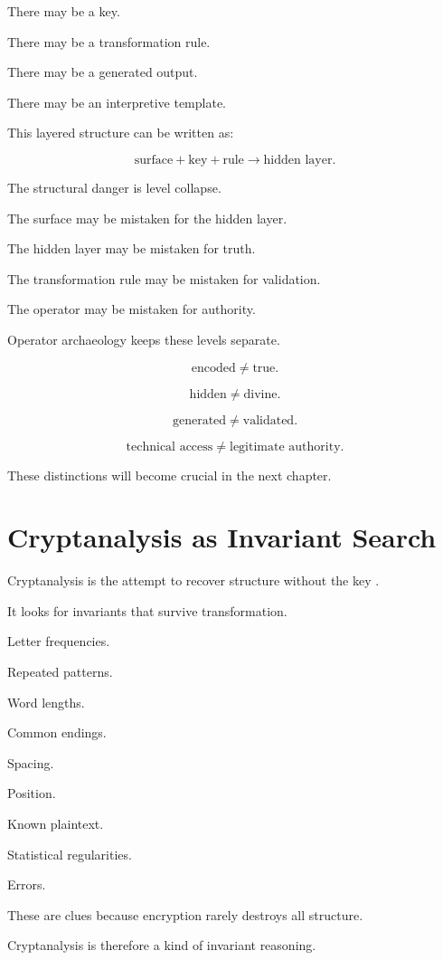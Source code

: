 \documentclass[11pt]{book}
\begin{document}
There may be a key.

There may be a transformation rule.

There may be a generated output.

There may be an interpretive template.

This layered structure can be written as:

\[
\text{surface}
+
\text{key}
+
\text{rule}
\rightarrow
\text{hidden layer}.
\]

The structural danger is level collapse.

The surface may be mistaken for the hidden layer.

The hidden layer may be mistaken for truth.

The transformation rule may be mistaken for validation.

The operator may be mistaken for authority.

Operator archaeology keeps these levels separate.

\[
\text{encoded} \neq \text{true}.
\]

\[
\text{hidden} \neq \text{divine}.
\]

\[
\text{generated} \neq \text{validated}.
\]

\[
\text{technical access} \neq \text{legitimate authority}.
\]

These distinctions will become crucial in the next chapter.

\section{Cryptanalysis as Invariant Search}

Cryptanalysis is the attempt to recover structure without the key \cite{Kahn1996Codebreakers,Singh1999CodeBook}.

It looks for invariants that survive transformation.

Letter frequencies.

Repeated patterns.

Word lengths.

Common endings.

Spacing.

Position.

Known plaintext.

Statistical regularities.

Errors.

These are clues because encryption rarely destroys all structure.

Cryptanalysis is therefore a kind of invariant reasoning.
\end{document}
